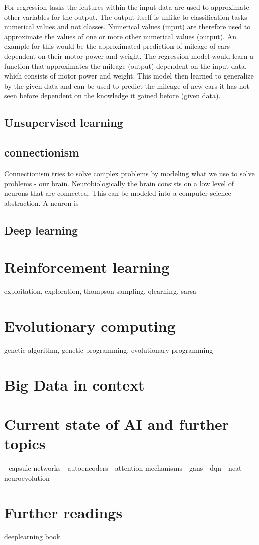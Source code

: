 \documentclass[jou,apacite]{apa6}
\begin{document}
For regression tasks the features within the input data are used to approximate other variables for the output. The output itself is unlike to classification tasks numerical values and not classes. Numerical values (input) are therefore used to approximate the values of one or more other numerical values (output). An example for this would be the approximated prediction of mileage of cars dependent on their motor power and weight. The regression model would learn a function that approximates the mileage (output) dependent on the input data, which consists of motor power and weight. This model then learned to generalize by the given data and can be used to predict the mileage of new cars it has not seen before dependent on the knowledge it gained before (given data).

\subsection{Unsupervised learning}

\subsection{\gls{connectionism}}
Connectionism tries to solve complex problems by modeling what we use to solve problems - our brain. Neurobiologically the brain consists on a low level of neurons that are connected. This can be modeled into a computer science abstraction. A neuron is 

\subsection{Deep learning}

\section{Reinforcement learning}
exploitation, exploration, thompson sampling, qlearning, sarsa

\section{Evolutionary computing}
genetic algorithm, genetic programming, evolutionary programming

\section{Big Data in context}

\section{Current state of AI and further topics}
 - capsule networks
 - autoencoders
 - attention mechanisms
 - gans
 - dqn
 - neat
 - neuroevolution

\section{Further readings}
deeplearning book

\printglossaries
\printindex

\end{document}
